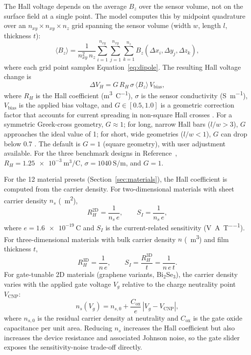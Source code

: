 \documentclass[biosensors,article,submit,pdftex,moreauthors]{Definitions/mdpi}
\begin{document}
The Hall voltage depends on the average $B_z$ over the sensor volume, not on the
surface field at a single point. The model computes this by midpoint quadrature
over an $n_{xy} \times n_{xy} \times n_z$ grid spanning the sensor volume (width
$w$, length $l$, thickness $t$):
\begin{equation}
\langle B_z \rangle = \frac{1}{n_{xy}^2 \, n_z}
\sum_{i=1}^{n_{xy}} \sum_{j=1}^{n_{xy}} \sum_{k=1}^{n_z}
B_z(\Delta x_i, \Delta y_j, \Delta z_k),
\label{eq:avgbz}
\end{equation}
where each grid point samples Equation~\eqref{eq:dipole}. The resulting Hall
voltage change is
\begin{equation}
\Delta V_H = G \, R_H \, \sigma \, \langle B_z \rangle \, V_{\text{bias}},
\label{eq:vh}
\end{equation}
where $R_H$ is the Hall coefficient (\si{\meter\cubed\per\coulomb}), $\sigma$ is the
sensor conductivity (\si{\siemens\per\meter}), $V_{\text{bias}}$ is the applied bias
voltage, and $G \in [0.5, 1.0]$ is a geometric correction factor that accounts for
current spreading in non-square Hall crosses \cite{popovic2004}. For a symmetric
Greek-cross geometry, $G \approx 1$; for long, narrow Hall bars ($l/w > 3$), $G$
approaches the ideal value of 1; for short, wide geometries ($l/w < 1$), $G$ can
drop below 0.7 \cite{popovic2004}. The default is $G = 1$ (square geometry), with
user adjustment available. For the three benchmark designs in
Reference~\cite{govindaraju2025}, $R_H = \SI{1.25e-3}{\meter\cubed\per\coulomb}$,
$\sigma = \SI{1040}{\siemens\per\meter}$, and $G = 1$.

For the 12 material presets (Section~\ref{sec:materials}), the Hall coefficient is
computed from the carrier density. For two-dimensional materials with sheet carrier
density $n_s$ (\si{\per\meter\squared}),
\begin{equation}
R_H^{\text{2D}} = \frac{1}{n_s \, e}, \qquad S_I = \frac{1}{n_s \, e},
\label{eq:rh2d}
\end{equation}
where $e = \SI{1.6e-19}{\coulomb}$ and $S_I$ is the current-related sensitivity
(\si{\volt\per\ampere\per\tesla}). For three-dimensional materials with bulk carrier
density $n$ (\si{\per\meter\cubed}) and film thickness $t$,
\begin{equation}
R_H^{\text{3D}} = \frac{1}{n \, e}, \qquad
S_I = \frac{R_H^{\text{3D}}}{t} = \frac{1}{n \, e \, t}.
\label{eq:rh3d}
\end{equation}
For gate-tunable 2D materials (graphene variants, Bi$_2$Se$_3$), the carrier density
varies with the applied gate voltage $V_g$ relative to the charge neutrality point
$V_{\text{CNP}}$:
\begin{equation}
n_s(V_g) = n_{s,0} + \frac{C_{\text{ox}}}{e}\,|V_g - V_{\text{CNP}}|,
\label{eq:gate}
\end{equation}
where $n_{s,0}$ is the residual carrier density at neutrality and $C_{\text{ox}}$ is
the gate oxide capacitance per unit area. Reducing $n_s$ increases the Hall
coefficient but also increases the device resistance and associated Johnson noise,
so the gate slider exposes the sensitivity-noise trade-off directly.
\end{document}
